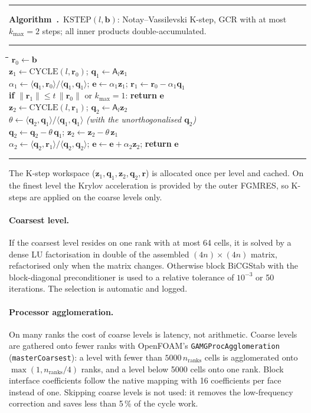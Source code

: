 \documentclass[11pt,a4paper]{article}
\newcounter{algorithm}
\newenvironment{algo}[2]{%
  \par\medskip\noindent
  \begin{minipage}{\linewidth}
  \refstepcounter{algorithm}\label{#2}%
  \hrule\smallskip\noindent\textbf{Algorithm~\thealgorithm.}\ #1\par
  \smallskip\hrule\smallskip\small
  \begin{tabbing}
  \hspace*{2em}\=\hspace*{2em}\=\hspace*{2em}\=\hspace*{2em}\=\kill}
  {\end{tabbing}\vspace*{-1ex}\hrule\end{minipage}\par\medskip}
\newcommand{\vect}[1]{\mathbf{#1}}
\newcommand{\code}[1]{\texttt{#1}}
\begin{document}
\begin{algo}{$\mathrm{KSTEP}(l,\vect b)$: Notay--Vassilevski K-step, GCR with at
most $k_{\max}=2$ steps; all inner products double-accumulated.}{alg:kstep}
$\vect r_0\leftarrow\vect b$\\
$\vect z_1\leftarrow\mathrm{CYCLE}(l,\vect r_0)$; \quad $\vect q_1\leftarrow\mathsf A_l\vect z_1$\\
$\alpha_1\leftarrow\langle\vect q_1,\vect r_0\rangle/\langle\vect q_1,\vect q_1\rangle$; \quad
$\vect e\leftarrow\alpha_1\vect z_1$; \quad $\vect r_1\leftarrow\vect r_0-\alpha_1\vect q_1$\\
\textbf{if} $\|\vect r_1\|\le t\,\|\vect r_0\|$ or $k_{\max}=1$: \textbf{return} $\vect e$\\
$\vect z_2\leftarrow\mathrm{CYCLE}(l,\vect r_1)$; \quad $\vect q_2\leftarrow\mathsf A_l\vect z_2$\\
$\theta\leftarrow\langle\vect q_2,\vect q_1\rangle/\langle\vect q_1,\vect q_1\rangle$ \quad \textit{(with the unorthogonalised $\vect q_2$)}\\
$\vect q_2\leftarrow\vect q_2-\theta\,\vect q_1$; \quad $\vect z_2\leftarrow\vect z_2-\theta\,\vect z_1$\\
$\alpha_2\leftarrow\langle\vect q_2,\vect r_1\rangle/\langle\vect q_2,\vect q_2\rangle$; \quad $\vect e\leftarrow\vect e+\alpha_2\vect z_2$; \quad \textbf{return} $\vect e$
\end{algo}

The K-step workspace ($\vect z_1,\vect q_1,\vect z_2,\vect q_2,\vect r$) is
allocated once per level and cached. On the finest level the Krylov
acceleration is provided by the outer FGMRES, so K-steps are applied on
the coarse levels only.

\paragraph{Coarsest level.} If the coarsest level resides on one rank with
at most 64 cells, it is solved by a dense LU factorisation in double of the
assembled $(4n)\times(4n)$ matrix, refactorised only when the matrix
changes. Otherwise block BiCGStab with the block-diagonal preconditioner is
used to a relative tolerance of $10^{-3}$ or 50 iterations. The selection is
automatic and logged.

\paragraph{Processor agglomeration.} On many ranks the cost of coarse levels
is latency, not arithmetic. Coarse levels are gathered onto fewer ranks with
OpenFOAM's \code{GAMGProcAgglomeration} (\code{masterCoarsest}): a level with
fewer than $5000\,n_{\mathrm{ranks}}$ cells is agglomerated onto
$\max(1,n_{\mathrm{ranks}}/4)$ ranks, and a level below 5000 cells onto one
rank. Block interface coefficients follow the native mapping with 16
coefficients per face instead of one. Skipping coarse levels is not used: it
removes the low-frequency correction and saves less than 5\,\% of the
cycle work.
\end{document}
